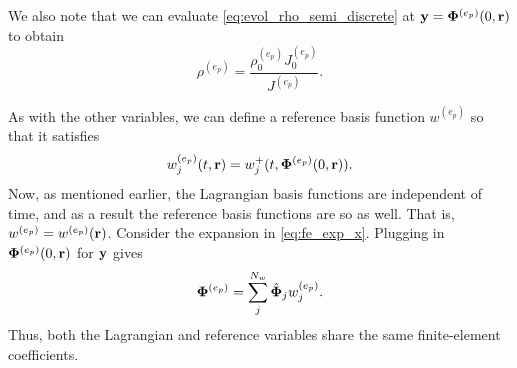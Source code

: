 \documentclass[11pt]{report}
\begin{document}
We also note that we can evaluate \cref{eq:evol_rho_semi_discrete} at $\mathbf{y} = \bm \Phi^{(e_p)}(0,\mathbf{r})$ to obtain
\begin{equation}
    \rho^{(e_p)} = \frac{\rho^{(e_p)}_0 J^{(e_p)}_0}{J^{(e_p)}}.
\end{equation}

As with the other variables, we can define a reference basis function $w^{(e_p)}$ so that it satisfies
\begin{equation}
    w_j^{(e_p)}(t,\mathbf{r}) = w_j^+(t,\bm \Phi^{(e_p)}(0,\mathbf{r})).
\end{equation}
Now, as mentioned earlier, the Lagrangian basis functions are independent of time, and as a result the reference basis functions are so as well. That is, $w^{(e_p)} = w^{(e_p)}(\mathbf{r})$. Consider the expansion in \cref{eq:fe_exp_x}. Plugging in $\bm \Phi^{(e_p)}(0,\mathbf{r})$ for $\mathbf{y}$ gives
\begin{equation}
    \label{eq:re_exp_x}
    \bm \Phi^{(e_p)} = \sum_j^{N_w} \hat{\bm \Phi}_j w^{(e_p)}_j.
\end{equation}
Thus, both the Lagrangian and reference variables share the same finite-element coefficients.

\end{document}
